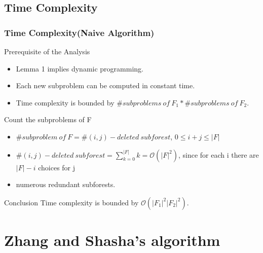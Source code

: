 \documentclass{beamer}
\begin{document}
\subsection{Time Complexity}
\begin{frame}
\frametitle{Time Complexity(Naive Algorithm)}
\begin{block}{Prerequisite of the Analysis}
\begin{itemize}
\item Lemma 1 implies dynamic programming.
\item Each new subproblem can be computed in constant time.
\item Time complexity is bounded by $\#subproblems\ of\ F_1 * \#subproblems\ of\ F_2$. 
\end{itemize}
\end{block}
\begin{block}{Count the subproblems of F}
\begin{itemize}
\item  $\#subproblem\ of\ F = \#(i,j)-deleted\ subforest$, $0 \leq i + j \leq \left\vert F \right\vert$ 
\item $\#(i, j)-deleted\ subforest = \sum_{k=0}^{\left\vert F \right\vert}k = \mathcal{O}(\left\vert F \right\vert^2)$, since for each i there are $\left\vert F \right\vert - i$ choices for j
\item numerous redundant subforests.
\end{itemize}
\end{block}
\begin{block}{Conclusion}
Time complexity is bounded by $\mathcal{O}(\left\vert F_1 \right\vert^2 \left\vert F_2 \right\vert^2)$. 
\end{block}
\end{frame}
\section{Zhang and Shasha's algorithm}
\end{document}
